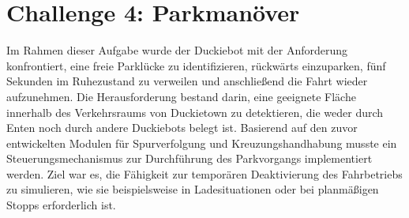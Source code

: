 \chapter{Challenge 4: Parkmanöver}
\label{ch:Challenge_4}

Im Rahmen dieser Aufgabe wurde der Duckiebot mit der Anforderung konfrontiert, eine freie Parklücke zu identifizieren, 
rückwärts einzuparken, fünf Sekunden im Ruhezustand zu verweilen und anschließend die Fahrt wieder aufzunehmen. Die 
Herausforderung bestand darin, eine geeignete Fläche innerhalb des Verkehrsraums von Duckietown zu detektieren, die 
weder durch Enten noch durch andere Duckiebots belegt ist. Basierend auf den zuvor entwickelten Modulen für Spurverfolgung 
und Kreuzungshandhabung musste ein Steuerungsmechanismus zur Durchführung des Parkvorgangs implementiert werden. 
Ziel war es, die Fähigkeit zur temporären Deaktivierung des Fahrbetriebs zu simulieren, wie sie beispielsweise in 
Ladesituationen oder bei planmäßigen Stopps erforderlich ist. 